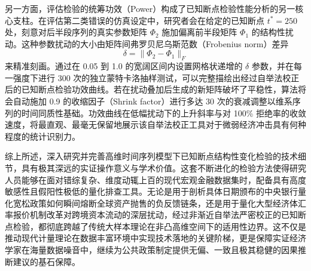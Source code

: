 \documentclass[UTF8,a4paper,12pt]{ctexbook}
\begin{document}
另一方面，评估检验的统筹功效（Power）构成了已知断点检验性能分析的另一核心支柱。在评估第二类错误的仿真设定中，研究者会在给定的已知断点 $t^*=250$ 处，刻意对后半段序列的真实参数矩阵 $\Phi_2$ 施加偏离前半段矩阵 $\Phi_1$ 的结构性扰动。这种参数扰动的大小由矩阵间弗罗贝尼乌斯范数（Frobenius norm）差异
\begin{equation}
\delta = \lVert \Phi_2 - \Phi_1 \rVert_F
\end{equation}
来精准刻画。通过在 0.05 到 1.0 的宽阔区间内设置网格状递增的 $\delta$ 参数，并在每一强度下进行 300 次的独立蒙特卡洛抽样测试，可以完整描绘出经过自举法校正后的已知断点检验功效曲线。若在扰动叠加后生成的新矩阵破坏了平稳性，算法将会自动施加 0.9 的收缩因子（Shrink factor）进行多达 30 次的衰减调整以维系序列的时间同质性基础。功效曲线在低幅扰动下的上升斜率与对 100\% 拒绝率的收敛速度，将最直观、最毫无保留地展示该自举法校正工具对于微弱经济冲击具有何种程度的统计识别力。

综上所述，深入研究并完善高维时间序列模型下已知断点结构性变化检验的技术细节，具有极其深远的实证操作意义与学术价值。这套不断进化的检验方法使得研究人员能够在面对错综复杂、维度动辄上百的现代宏观金融数据集时，配备具有高度敏感性且假阳性极低的量化排查工具。无论是用于剖析具体日期颁布的中央银行量化宽松政策如何瞬间熔断全球资产抛售的负反馈链条，还是用于量化大型经济体汇率报价机制改革对跨境资本流动的深层扰动，经过非渐近自举法严密校正的已知断点检验，都彻底跨越了传统大样本理论在非凸高维空间下的适用性边界。这不仅是推动现代计量理论在数据丰富环境中实现技术落地的关键阶梯，更是保障实证经济学家在海量数据噪音中，继续为公共政策制定提供无偏、一致且极其稳健的因果推断建议的基石保障。
\end{document}
